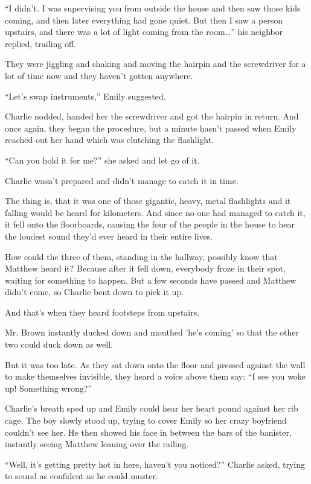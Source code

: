“I didn't. I was supervising you from outside the house and then saw those kids coming, and then later everything had gone quiet. But then I saw a person upstairs, and there was a lot of light coming from the room…” his neighbor replied, trailing off.

They were jiggling and shaking and moving the hairpin and the screwdriver for a lot of time now and they haven't gotten anywhere.

“Let's swap instruments,” Emily suggested.

Charlie nodded, handed her the screwdriver and got the hairpin in return. And once again, they began the procedure, but a minute hasn't passed when Emily reached out her hand which was clutching the flashlight.

“Can you hold it for me?” she asked and let go of it.

Charlie wasn't prepared and didn't manage to catch it in time.

The thing is, that it was one of those gigantic, heavy, metal flashlights and it falling would be heard for kilometers. And since no one had managed to catch it, it fell onto the floorboards, causing the four of the people in the house to hear the loudest sound they'd ever heard in their entire lives.

How could the three of them, standing in the hallway, possibly know that Matthew heard it? Because after it fell down, everybody froze in their spot, waiting for something to happen. But a few seconds have passed and Matthew didn't come, so Charlie bent down to pick it up.

And that's when they heard footsteps from upstairs.

Mr. Brown instantly ducked down and mouthed 'he's coming' so that the other two could duck down as well.

But it was too late. As they sat down onto the floor and pressed against the wall to make themselves invisible, they heard a voice above them say:
“I see you woke up! Something wrong?”

Charlie's breath sped up and Emily could hear her heart pound against her rib cage. The boy slowly stood up, trying to cover Emily so her crazy boyfriend couldn't see her. He then showed his face in between the bars of the banister, instantly seeing Matthew leaning over the railing.

“Well, it's getting pretty hot in here, haven't you noticed?” Charlie asked, trying to sound as confident as he could muster.

